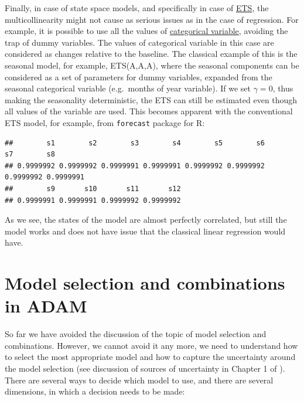\documentclass[
]{book}
\newenvironment{Shaded}{\begin{snugshade}}{\end{snugshade}}
\newcommand{\CommentTok}[1]{\textcolor[rgb]{0.56,0.35,0.01}{\textit{#1}}}
\newcommand{\DecValTok}[1]{\textcolor[rgb]{0.00,0.00,0.81}{#1}}
\newcommand{\FunctionTok}[1]{\textcolor[rgb]{0.00,0.00,0.00}{#1}}
\newcommand{\NormalTok}[1]{#1}
\newcommand{\OtherTok}[1]{\textcolor[rgb]{0.56,0.35,0.01}{#1}}
\newcommand{\SpecialCharTok}[1]{\textcolor[rgb]{0.00,0.00,0.00}{#1}}
\newcommand{\StringTok}[1]{\textcolor[rgb]{0.31,0.60,0.02}{#1}}
\theoremstyle{definition}
\theoremstyle{definition}
\theoremstyle{definition}
\theoremstyle{definition}
\theoremstyle{remark}
\begin{document}
Finally, in case of state space models, and specifically in case of \protect\hyperlink{ADAMX}{ETS}, the multicollinearity might not cause as serious issues as in the case of regression. For example, it is possible to use all the values of \protect\hyperlink{ETSXDynamicCategories}{categorical variable}, avoiding the trap of dummy variables. The values of categorical variable in this case are considered as changes relative to the baseline. The classical example of this is the seasonal model, for example, ETS(A,A,A), where the seasonal components can be considered as a set of parameters for dummy variables, expanded from the seasonal categorical variable (e.g.~months of year variable). If we set \(\gamma=0\), thus making the seasonality deterministic, the ETS can still be estimated even though all values of the variable are used. This becomes apparent with the conventional ETS model, for example, from \texttt{forecast} package for R:

\begin{Shaded}
\end{Shaded}

\begin{verbatim}
##        s1        s2        s3        s4        s5        s6        s7        s8 
## 0.9999992 0.9999992 0.9999991 0.9999991 0.9999992 0.9999992 0.9999992 0.9999991 
##        s9       s10       s11       s12 
## 0.9999991 0.9999991 0.9999992 0.9999992
\end{verbatim}

As we see, the states of the model are almost perfectly correlated, but still the model works and does not have issue that the classical linear regression would have.

\hypertarget{ADAMSelection}{%
\chapter{Model selection and combinations in ADAM}\label{ADAMSelection}}

So far we have avoided the discussion of the topic of model selection and combinations. However, we cannot avoid it any more, we need to understand how to select the most appropriate model and how to capture the uncertainty around the model selection (see discussion of sources of uncertainty in Chapter 1 of \citet{SvetunkovSBA}). There are several ways to decide which model to use, and there are several dimensions, in which a decision needs to be made:
\end{document}

